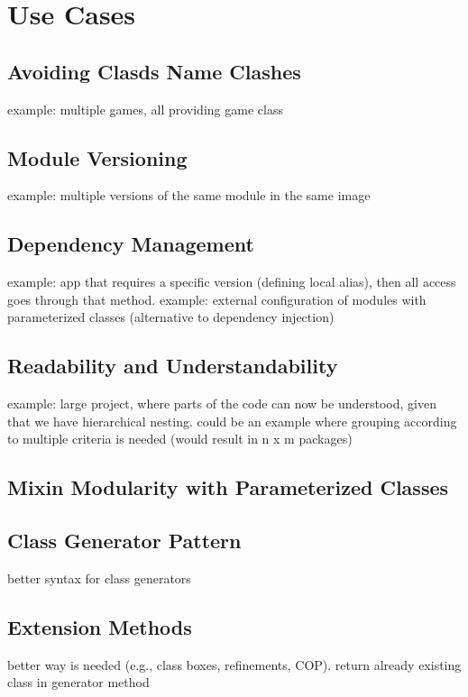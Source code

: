 \chapter{Use Cases}

\section{Avoiding Clasds Name Clashes}
example: multiple games, all providing game class

\section{Module Versioning}
example: multiple versions of the same module in the same image

\section{Dependency Management}
example: app that requires a specific version (defining local alias), then all access goes through that method. example: external configuration of modules with parameterized classes (alternative to dependency injection)

\section{Readability and Understandability}
example: large project, where parts of the code can now be understood, given that we have hierarchical nesting. could be an example where grouping according to multiple criteria is needed (would result in n x m packages)

\section{Mixin Modularity with Parameterized Classes}

\section{Class Generator Pattern}
\label{sec:usecase_classgen}
better syntax for class generators

\section{Extension Methods}
better way is needed (e.g., class boxes, refinements, COP). return already existing class in generator method
